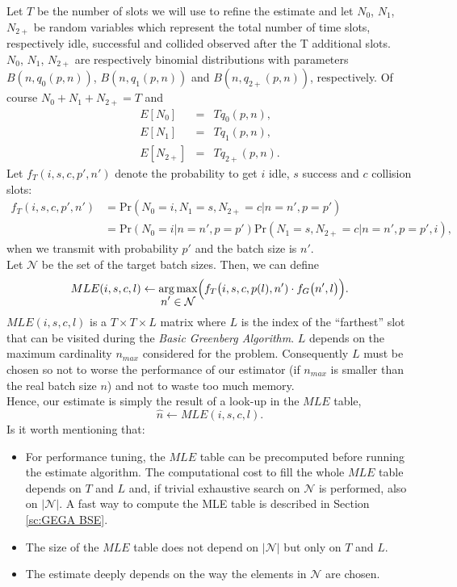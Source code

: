 \documentclass[11pt,a4paper,twoside,openright]{book}
\DeclareMathOperator*{\argmax}{arg\,max}
\newcommand{\fg}{f_{G}}
\begin{document}
 Let $T$ be the number of slots we will use to refine the estimate and let $N_{0}$, $N_{1}$, $N_{2+}$ be random variables which represent the total number of time slots, respectively idle, successful and collided observed after the T additional slots.\\
 $N_{0}$, $N_{1}$, $N_{2+}$ are respectively binomial distributions with parameters $B(n,q_{0}(p,n))$, $B(n,q_{1}(p,n))$ and $B(n,q_{2+}(p,n))$, respectively. Of course $N_{0}+N_{1}+N_{2+}=T$ and
 \begin{eqnarray*}
E[N_{0}] &=& Tq_{0}(p,n),\\
E[N_{1}] &=& Tq_{1}(p,n),\\
E[N_{2+}] &=& Tq_{2+}(p,n).
\end{eqnarray*}
Let $f_{T}(i,s,c,p',n')$ denote the probability to get $i$ idle, $s$ success and $c$ collision slots:
\begin{align}
\label{eg:Bettiol-test}
f_{T}(i,s,c,p',n')&= \textrm{Pr}(N_{0}=i,N_{1}=s,N_{2+}=c|n=n',p=p')\\
\nonumber
 &=\textrm{Pr}(N_{0}=i|n=n',p=p')\textrm{Pr}(N_{1}=s,N_{2+}=c|n=n',p=p',i),
\end{align}
when we transmit with probability $p'$ and the batch size is $n'$.\\
Let $\mathcal{N}$ be the set of the target batch sizes. Then, we can define
\begin{equation}
MLE(i,s,c,l) \gets \argmax_{\displaystyle{n' \in \mathcal{N}}} \Bigl( f_{T}\bigl(i,s,c,p(l),n')\cdot \fg\bigl(n',l\bigr)\Bigr).
\label{eq:MLEiscl}
\end{equation}
$MLE(i,s,c,l)$ is a $T \times T \times L$ matrix where $L$ is the index of the ``farthest'' slot that can be visited during the  \emph{Basic Greenberg Algorithm}. $L$ depends on the maximum cardinality  $n_{max}$ considered for the problem. Consequently  $L$ must be chosen so not to worse the performance of our estimator (if $n_{max}$ is smaller than the real batch size $n$) and not to waste too much memory.\\
Hence, our estimate is simply the result of a look-up in the $MLE$ table,
\begin{equation}
\hat{n} \longleftarrow MLE(i,s,c,l).
\end{equation}
Is it worth mentioning that:
\begin{itemize}
\item  For performance tuning, the $MLE$ table can be precomputed before running the estimate algorithm. The computational cost to fill the whole $MLE$ table depends on $T$ and $L$ and, if trivial exhaustive search on $\mathcal{N}$ is performed, also on $|\mathcal{N}|$. A fast way to compute the MLE table is described in Section \ref{sc:GEGA BSE}.
\item The size of the $MLE$ table does not depend on $|\mathcal{N}|$ but only on $T$ and $L$.
\item The estimate deeply depends on the way the elements in $\mathcal{N}$ are chosen. \\
\end{itemize}
\end{document}
